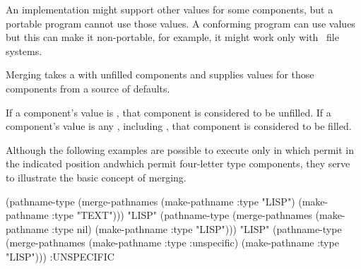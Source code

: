 \itemitem{\bull}
An implementation might support other values for some components,
    but a portable program cannot use those values.  A conforming program
    can use  values but this can make it
    non-portable, for example, it might work only with \Unix\ file systems.
\endlist                                   


\endsubsubsection%


\endSubsection%


Merging takes a  with unfilled components
and supplies values for those components from a source of defaults.

If a component's value is \nil, that component is considered to be unfilled.
If a component's value is any  , 
including , that component is considered to be filled.


Although the following examples are possible to execute only in
 which permit  in the indicated
position andwhich permit four-letter type components, they serve to illustrate
the basic concept of  merging.

\medbreak
\code
 (pathname-type 
   (merge-pathnames (make-pathname :type "LISP")
                    (make-pathname :type "TEXT")))
\EV "LISP"
\smallbreak
 (pathname-type 
   (merge-pathnames (make-pathname :type nil)
                    (make-pathname :type "LISP")))
\EV "LISP"
\smallbreak
 (pathname-type 
   (merge-pathnames (make-pathname :type :unspecific)
                    (make-pathname :type "LISP")))
\EV :UNSPECIFIC
\endcode

\endsubsubsection%

\endsubSection%

